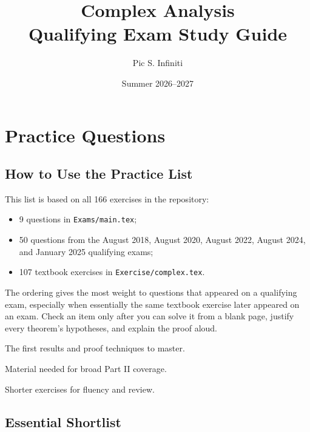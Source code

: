 \documentclass[11pt,a4paper,openany]{book}
\title{\Huge\bfseries Complex Analysis\\[0.25em]
  \Large Qualifying Exam Study Guide}
\author{Pic S. Infiniti}
\date{Summer 2026--2027}
\theoremstyle{studyplain}
\theoremstyle{studydefinition}
\theoremstyle{studyremark}
\begin{document}
\frontmatter
\maketitle
\thispagestyle{empty}
\clearpage

\hypersetup{pageanchor=false}
\tableofcontents
\clearpage
\hypersetup{pageanchor=true}

\mainmatter

\part{Practice Questions}
\chapter{How to Use the Practice List}
\label{chapter-practice}

This list is based on all 166 exercises in the repository:


\begin{itemize}[leftmargin=*,itemsep=0.55em,topsep=0.45em]
\item 9 questions in \texttt{Exams/main.tex};
\item 50 questions from the August 2018, August 2020, August 2022, August 2024, and January 2025 qualifying exams;
\item 107 textbook exercises in \texttt{Exercise/complex.tex}.
\end{itemize}

The ordering gives the most weight to questions that appeared on a qualifying exam, especially when essentially the same textbook exercise later appeared on an exam. Check an item only after you can solve it from a blank page, justify every theorem's hypotheses, and explain the proof aloud.



\begin{description}[style=nextline,leftmargin=2em,labelindent=0pt]
\item[Essential / Top 12] The first results and proof techniques to master.
\item[Important advanced] Material needed for broad Part II coverage.
\item[Warm-up] Shorter exercises for fluency and review.
\end{description}

\chapter{Essential Shortlist}
\label{practice-if-time-is-short-do-these-12-first}
\end{document}
